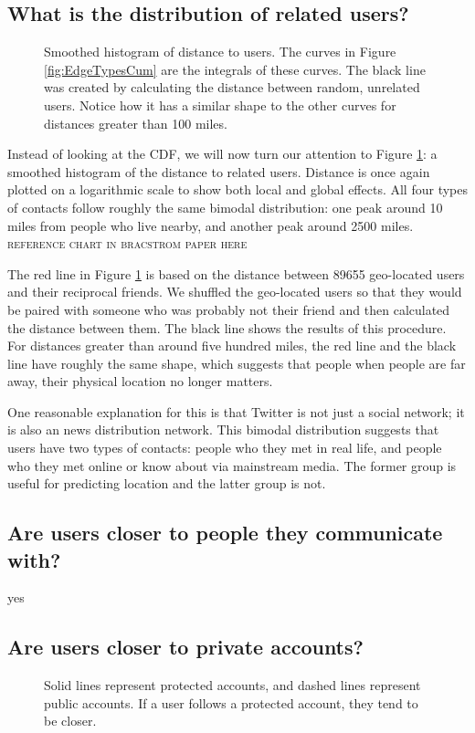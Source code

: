 \documentclass{sig-alternate}
\begin{document}
\subsection{What is the distribution of related users?}
\begin{figure}
\centering
{}
\caption{
Smoothed histogram of distance to users.  The curves in Figure
\ref{fig:EdgeTypesCum} are the integrals of these curves. The black line was created by calculating the distance between random, unrelated users. Notice how it has a similar shape to the other curves for distances greater than 100 miles.
}
\label{fig:EdgeTypes}
\end{figure}
Instead of looking at the CDF, we will now turn our attention to Figure
\ref{fig:EdgeTypes}: a smoothed histogram of the distance to related users.
Distance is once again plotted on a logarithmic scale to show both local and
global effects.
All four types of contacts follow roughly the same bimodal distribution:
one peak around 10 miles from people who live nearby, and another peak around
2500 miles.
\textsc{reference chart in bracstrom paper here}

The red line in Figure \ref{fig:EdgeTypes} is based on the distance between
89655 geo-located users and their reciprocal friends. We shuffled the
geo-located users so that they would be paired with someone who was probably
not their friend and then calculated the distance between them. The black line
shows the results of this procedure. For distances greater than around five
hundred miles, the red line and the black line have roughly the same shape,
which suggests that people when people are far away, their physical location no longer matters.

One reasonable explanation for this is that Twitter is not just a social
network; it is also an news distribution network.  This bimodal distribution
suggests that users have two types of contacts: people who they met in
real life, and people who they met online or know about via mainstream media.
The former group is useful for predicting location and the latter group is not.


\subsection{Are users closer to people they communicate with?}
yes

\subsection{Are users closer to private accounts?}
\begin{figure}
\centering
{}
\caption{ Solid lines represent protected accounts, and dashed lines represent
public accounts. If a user follows a protected account, they tend to be closer.}
\label{fig:EdgeTypesProt}
\end{figure}
\end{document}
